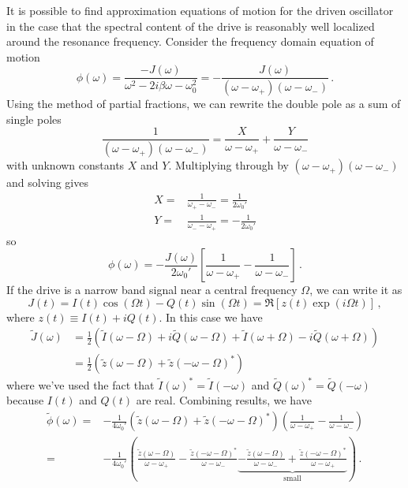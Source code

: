 
It is possible to find approximation equations of motion for the driven oscillator in the case that the spectral content of the drive is reasonably well localized around the resonance frequency.
Consider the frequency domain equation of motion
\begin{equation}
  \phi(\omega) = \frac{-J(\omega)}{\omega^2 - 2 i \beta \omega - \omega_0^2}
  = - \frac{J(\omega)}{(\omega - \omega_+)(\omega - \omega_-)} \, .
\end{equation}
Using the method of partial fractions, we can rewrite the double pole as a sum of single poles
\begin{equation}
  \frac{1}{(\omega - \omega_+)(\omega - \omega_-)}
  = \frac{X}{\omega - \omega_+} + \frac{Y}{\omega - \omega_-}
\end{equation}
with unknown constants $X$ and $Y$.
Multiplying through by $(\omega - \omega_+)(\omega - \omega_-)$ and solving gives
\begin{align*}
  X =& \frac{1}{\omega_+ - \omega_-} =   \frac{1}{2 \omega_0'} \\
  Y =& \frac{1}{\omega_- - \omega_+} = - \frac{1}{2 \omega_0'}
\end{align*}
so
\begin{equation}
  \phi(\omega) = - \frac{J(\omega)}{2 \omega_0'}
  \left[ \frac{1}{\omega - \omega_+} - \frac{1}{\omega - \omega_-} \right] \, .
\end{equation}
If the drive is a narrow band signal near a central frequency $\Omega$, we can write it as
\begin{equation}
  J(t)
  = I(t) \cos(\Omega t) - Q(t) \sin(\Omega t)
  = \Re \left[ z(t) \exp \left( i \Omega t \right) \right] \, ,
\end{equation}
where $z(t) \equiv I(t) + i Q(t)$.
In this case we have
\begin{align*}
  \tilde{J}(\omega)
  &= \frac{1}{2} \left(
      \tilde{I}(\omega - \Omega) + i \tilde{Q}(\omega - \Omega)
    + \tilde{I}(\omega + \Omega) - i \tilde{Q}(\omega + \Omega)
  \right) \\
  &= \frac{1}{2} \left(
      \tilde{z}(\omega - \Omega) + \tilde{z}(-\omega - \Omega)^*
  \right)
\end{align*}
where we've used the fact that $\tilde{I}(\omega)^* = \tilde{I}(-\omega)$ and $\tilde{Q}(\omega)^* = \tilde{Q}(-\omega)$ because $I(t)$ and $Q(t)$ are real.
Combining results, we have
\begin{align*}
  \tilde{\phi}(\omega)
  =& - \frac{1}{4 \omega_0'}
  \left( \tilde{z}(\omega - \Omega) + \tilde{z}(-\omega - \Omega)^* \right)
  \left(
    \frac{1}{\omega - \omega_+} - \frac{1}{\omega - \omega_-}
  \right) \\
  =& - \frac{1}{4 \omega_0'}
  \left(
      \frac{\tilde{z}(\omega - \Omega)}{\omega - \omega_+}
    - \frac{\tilde{z}(-\omega - \Omega)^*}{\omega - \omega_-}
    \underbrace{
      - \frac{\tilde{z}(\omega - \Omega)}{\omega - \omega_-}
      + \frac{\tilde{z}(-\omega - \Omega)^*}{\omega - \omega_+}
    }_\text{small}
  \right)
  \, .
\end{align*}
